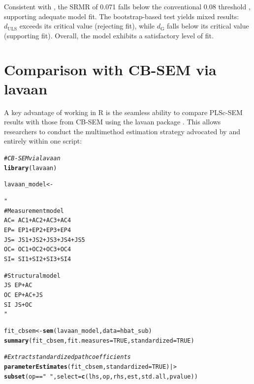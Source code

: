 \documentclass[12pt,a4paper]{article}\usepackage[]{graphicx}\usepackage[]{xcolor}
\makeatletter
\newcommand{\hlnum}[1]{\textcolor[rgb]{0.686,0.059,0.569}{#1}}%
\newcommand{\hlsng}[1]{\textcolor[rgb]{0.192,0.494,0.8}{#1}}%
\newcommand{\hlcom}[1]{\textcolor[rgb]{0.678,0.584,0.686}{\textit{#1}}}%
\newcommand{\hlopt}[1]{\textcolor[rgb]{0,0,0}{#1}}%
\newcommand{\hldef}[1]{\textcolor[rgb]{0.345,0.345,0.345}{#1}}%
\newcommand{\hlkwb}[1]{\textcolor[rgb]{0.69,0.353,0.396}{#1}}%
\newcommand{\hlkwc}[1]{\textcolor[rgb]{0.333,0.667,0.333}{#1}}%
\newcommand{\hlkwd}[1]{\textcolor[rgb]{0.737,0.353,0.396}{\textbf{#1}}}%
\newenvironment{kframe}{%
 \def\at@end@of@kframe{}%
 \ifinner\ifhmode%
  \def\at@end@of@kframe{\end{minipage}}%
  \begin{minipage}{\columnwidth}%
 \fi\fi%
 \def\FrameCommand##1{\hskip\@totalleftmargin \hskip-\fboxsep
 \colorbox{shadecolor}{##1}\hskip-\fboxsep
     \hskip-\linewidth \hskip-\@totalleftmargin \hskip\columnwidth}%
 \MakeFramed {\advance\hsize-\width
   \@totalleftmargin\z@ \linewidth\hsize
   \@setminipage}}%
 {\par\unskip\endMakeFramed%
 \at@end@of@kframe}
\newenvironment{knitrout}{}{} %
\newcommand{\pkg}[1]{\textsf{#1}}
\makeatother
\begin{document}
Consistent with \citet[Table~4]{Cheah2026}, the SRMR of 0.071 falls below the conventional 0.08 threshold \citep{Hu1999}, supporting adequate model fit. The bootstrap-based test yields mixed results: $d_\text{ULS}$ exceeds its critical value (rejecting fit), while $d_\text{G}$ falls below its critical value (supporting fit). Overall, the model exhibits a satisfactory level of fit.


\section{Comparison with CB-SEM via lavaan}

A key advantage of working in R is the seamless ability to compare PLSc-SEM results with those from CB-SEM using the \pkg{lavaan} package \citep{Rosseel2012}. This allows researchers to conduct the multimethod estimation strategy advocated by \citet{Cheah2026} and \citet{Sarstedt2024} entirely within one script:

\begin{knitrout}\small
{}\color{fgcolor}\begin{kframe}
\begin{alltt}
\hlcom{# CB-SEM via lavaan}
\hlkwd{library}\hldef{(lavaan)}

\hldef{lavaan_model} \hlkwb{<-} \hlsng{"
  # Measurement model
  AC =~ AC1 + AC2 + AC3 + AC4
  EP =~ EP1 + EP2 + EP3 + EP4
  JS =~ JS1 + JS2 + JS3 + JS4 + JS5
  OC =~ OC1 + OC2 + OC3 + OC4
  SI =~ SI1 + SI2 + SI3 + SI4

  # Structural model
  JS ~ EP + AC
  OC ~ EP + AC + JS
  SI ~ JS + OC
"}

\hldef{fit_cbsem} \hlkwb{<-} \hlkwd{sem}\hldef{(lavaan_model,} \hlkwc{data} \hldef{= hbat_sub)}
\hlkwd{summary}\hldef{(fit_cbsem,} \hlkwc{fit.measures} \hldef{=} \hlnum{TRUE}\hldef{,} \hlkwc{standardized} \hldef{=} \hlnum{TRUE}\hldef{)}

\hlcom{# Extract standardized path coefficients}
\hlkwd{parameterEstimates}\hldef{(fit_cbsem,} \hlkwc{standardized} \hldef{=} \hlnum{TRUE}\hldef{) |>}
  \hlkwd{subset}\hldef{(op} \hlopt{==} \hlsng{"~"}\hldef{,} \hlkwc{select} \hldef{=} \hlkwd{c}\hldef{(lhs, op, rhs, est, std.all, pvalue))}
\end{alltt}
\end{kframe}
\end{knitrout}
\end{document}
